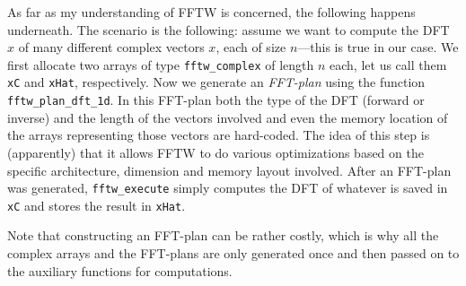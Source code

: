 \documentclass[a4paper]{article}
\begin{document}
As far as my understanding of FFTW is concerned, the following happens
underneath. The scenario is the following: assume we want to compute the DFT
$\hat{x}$ of many different complex vectors $x$, each of size $n$---this is
true in our case. We first allocate two arrays of type \texttt{fftw\_complex}
of length $n$ each, let us call them \texttt{xC} and \texttt{xHat},
respectively. Now we generate an \emph{FFT-plan} using the function
\texttt{fftw\_plan\_dft\_1d}. In this FFT-plan both the type of the DFT
(forward or inverse) and the length of the vectors involved and even the
memory location of the arrays representing those vectors are hard-coded. The
idea of this step is (apparently) that it allows FFTW to do various
optimizations based on the specific architecture, dimension and memory layout
involved. After an FFT-plan was generated, \texttt{fftw\_execute} simply
computes the DFT of whatever is saved in \texttt{xC} and stores the result in
\texttt{xHat}.

Note that constructing an FFT-plan can be rather costly, which is why all the
complex arrays and the FFT-plans are only generated once and then passed on to
the auxiliary functions for computations.
\end{document}
